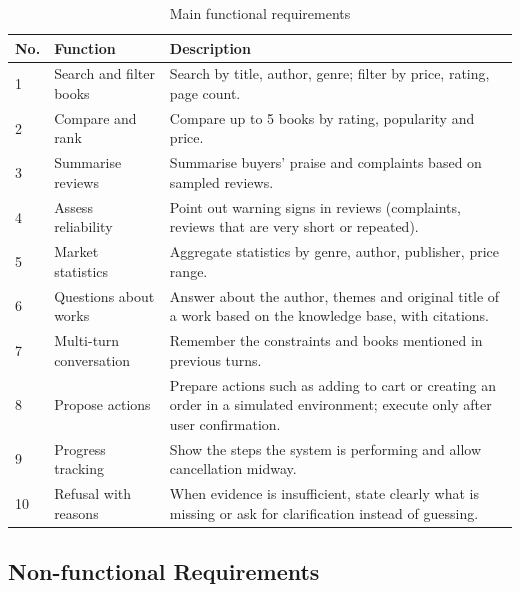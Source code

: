 \begin{table}[!htbp]
\caption{Main functional requirements}
\label{tab:yc-chuc-nang}
\cobang
\begin{tabularx}{\linewidth}{C{1.1cm}P{4.2cm}Y}
\toprule
\textbf{No.} & \textbf{Function} & \textbf{Description}\\
 & Search and filter books & Search by title, author, genre; filter by price, rating, page count.\\
2 & Compare and rank & Compare up to 5 books by rating, popularity and price.\\
3 & Summarise reviews & Summarise buyers' praise and complaints based on sampled reviews.\\
4 & Assess reliability & Point out warning signs in reviews (complaints, reviews that are very short or repeated).\\
5 & Market statistics & Aggregate statistics by genre, author, publisher, price range.\\
6 & Questions about works & Answer about the author, themes and original title of a work based on the knowledge base, with citations.\\
7 & Multi-turn conversation & Remember the constraints and books mentioned in previous turns.\\
8 & Propose actions & Prepare actions such as adding to cart or creating an order in a simulated environment; execute only after user confirmation.\\
9 & Progress tracking & Show the steps the system is performing and allow cancellation midway.\\
10 & Refusal with reasons & When evidence is insufficient, state clearly what is missing or ask for clarification instead of guessing.\\
\bottomrule
\end{tabularx}
\end{table}

\subsection{Non-functional Requirements}


